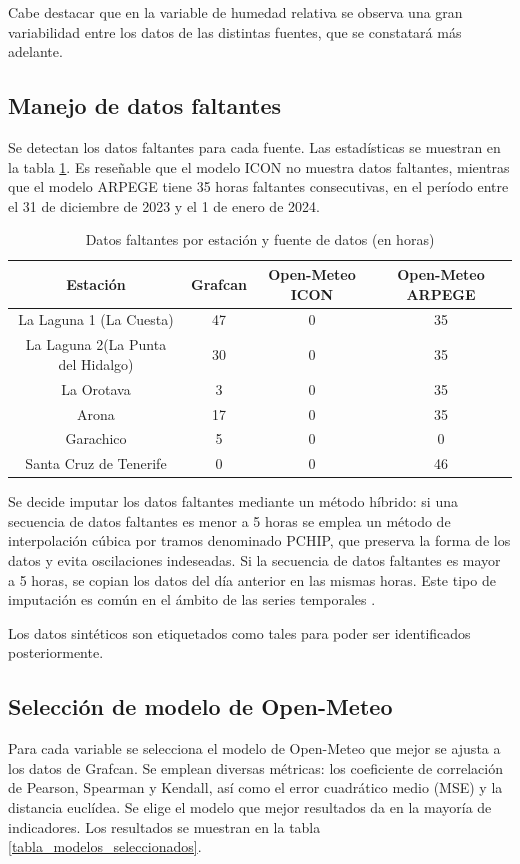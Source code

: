 Cabe destacar que en la variable de humedad relativa se observa una gran variabilidad entre los datos de las distintas fuentes, que se constatará más adelante.

\subsection{Manejo de datos faltantes}
Se detectan los datos faltantes para cada fuente. Las estadísticas se muestran en la tabla \ref{tabla_datos_faltantes}. 
Es reseñable que el modelo ICON no muestra datos faltantes, mientras que el modelo ARPEGE tiene 35 horas faltantes consecutivas, en el período entre el 31 de diciembre de 2023 y el 1 de enero de 2024.

\begin{table}[htb]
    \centering
    \begin{tabular}{|c|c|c|c|}
        \hline
        Estación & Grafcan & Open-Meteo ICON & Open-Meteo ARPEGE \\
        \hline
        La Laguna 1 (La Cuesta) & 47 & 0 & 35 \\
        La Laguna 2(La Punta del Hidalgo) & 30 & 0 & 35 \\
        La Orotava & 3 & 0 & 35 \\
        Arona & 17 & 0 & 35 \\
        Garachico & 5 & 0 & 0 \\
        Santa Cruz de Tenerife & 0 & 0 & 46 \\
        \hline
    \end{tabular}
    \caption{Datos faltantes por estación y fuente de datos (en horas)}
    \label{tabla_datos_faltantes} 
\end{table}

Se decide imputar los datos faltantes mediante un método híbrido: si una secuencia de datos faltantes es menor a 5 horas se emplea 
un método de interpolación cúbica por tramos denominado PCHIP\cite{fritsch1980}, que preserva la forma de los datos y evita oscilaciones indeseadas.
Si la secuencia de datos faltantes es mayor a 5 horas, se copian los datos del día anterior en las mismas horas. 
Este tipo de imputación es común en el ámbito de las series temporales \cite{tawakuli2024}.

Los datos sintéticos son etiquetados como tales para poder ser identificados posteriormente.


\subsection{Selección de modelo de Open-Meteo}
Para cada variable se selecciona el modelo de Open-Meteo que mejor se ajusta a los datos de Grafcan.
Se emplean diversas métricas: los coeficiente de correlación de Pearson, Spearman y Kendall, así como el error cuadrático medio (MSE) y 
la distancia euclídea. Se elige el modelo que mejor resultados da en la mayoría de indicadores. Los resultados se muestran en la tabla \ref{tabla_modelos_seleccionados}.

